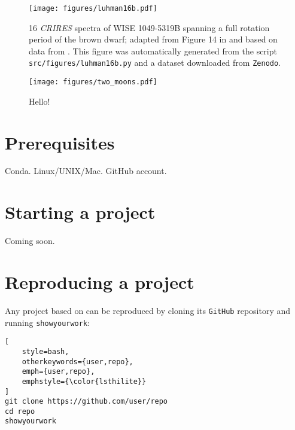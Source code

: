 \documentclass[twocolumn]{aastex631}
\begin{document}
\begin{figure}[ht!]
    \begin{centering}
        \texttt{[image: figures/luhman16b.pdf]}
        \caption{
            16 \emph{CRIRES} spectra of WISE 1049-5319B spanning a full rotation period of the brown dwarf; adapted from Figure 14 in \citet{Luger2021} and based on data from \citet{Crossfield2014}.
            This figure was automatically generated from the script \texttt{src/figures/luhman16b.py} and a dataset downloaded from \texttt{Zenodo}.
        }
        \label{fig:luhman16b}
    \end{centering}
\end{figure}

\begin{figure}[ht!]
    \begin{centering}
        \texttt{[image: figures/two\_moons.pdf]}
        \caption{
            Hello!
        }
        \label{fig:two_moons}
    \end{centering}
\end{figure}

\section{Prerequisites}
\label{sec:prereq}
Conda. Linux/UNIX/Mac. GitHub account.

\section{Starting a project}
\label{sec:start}
%
Coming soon.

\section{Reproducing a project}
\label{sec:reproduce}
%
Any project based on \showyourwork can be reproduced by cloning its \texttt{GitHub} repository and running \texttt{showyourwork}:\\

\noindent\begin{minipage}{\linewidth}
\begin{lstlisting}[
    style=bash,
    otherkeywords={user,repo},
    emph={user,repo},
    emphstyle={\color{lsthilite}}
]
git clone https://github.com/user/repo
cd repo
showyourwork
\end{lstlisting}
\end{minipage}
\end{document}
